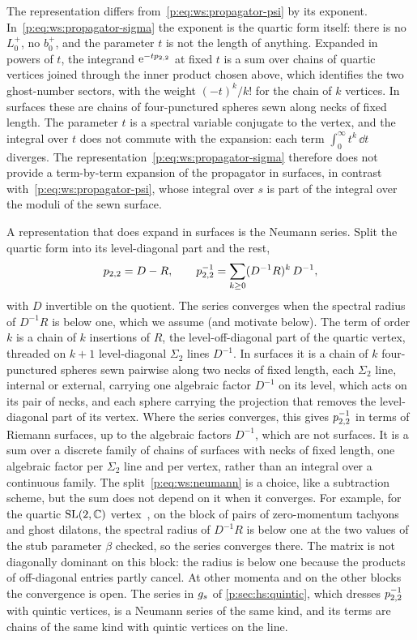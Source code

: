 The representation differs from~\eqref{p:eq:ws:propagator-psi} by its exponent.
In~\eqref{p:eq:ws:propagator-sigma} the exponent is the quartic form itself: there is no $L_0^+$, no $b_0^+$, and the parameter $t$ is not the length of anything.
Expanded in powers of $t$, the integrand $\mathrm{e}^{- t p_{2,2}}$ at fixed $t$ is a sum over chains of quartic vertices joined through the inner product chosen above, which identifies the two ghost-number sectors, with the weight $(- t)^k / k!$ for the chain of $k$ vertices.
In surfaces these are chains of four-punctured spheres sewn along necks of fixed length.
The parameter $t$ is a spectral variable conjugate to the vertex, and the integral over $t$ does not commute with the expansion: each term $\int_0^\infty t^k \, \dd t$ diverges.
The representation~\eqref{p:eq:ws:propagator-sigma} therefore does not provide a term-by-term expansion of the propagator in surfaces, in contrast with~\eqref{p:eq:ws:propagator-psi}, whose integral over $s$ is part of the integral over the moduli of the sewn surface.

A representation that does expand in surfaces is the Neumann series.
Split the quartic form into its level-diagonal part and the rest,
\begin{equation}
  \label{p:eq:ws:neumann}
  p_{2,2}
    = D - R,
  \qquad
  p_{2,2}^{-1}
    = \sum_{k \ge 0} (D^{-1} R)^k \, D^{-1},
\end{equation}
with $D$ invertible on the quotient.
The series converges when the spectral radius of $D^{-1} R$ is below one, which we assume (and motivate below).
The term of order $k$ is a chain of $k$ insertions of $R$, the level-off-diagonal part of the quartic vertex, threaded on $k + 1$ level-diagonal $\Sigma_2$ lines $D^{-1}$.
In surfaces it is a chain of $k$ four-punctured spheres sewn pairwise along two necks of fixed length, each $\Sigma_2$ line, internal or external, carrying one algebraic factor $D^{-1}$ on its level, which acts on its pair of necks, and each sphere carrying the projection that removes the level-diagonal part of its vertex.
Where the series converges, this gives $p_{2,2}^{-1}$ in terms of Riemann surfaces, up to the algebraic factors $D^{-1}$, which are not surfaces.
It is a sum over a discrete family of chains of surfaces with necks of fixed length, one algebraic factor per $\Sigma_2$ line and per vertex, rather than an integral over a continuous family.
The split~\eqref{p:eq:ws:neumann} is a choice, like a subtraction scheme, but the sum does not depend on it when it converges.
For example, for the quartic $\mathrm{SL}(2, \mathbb{C})$ vertex~\cite{Erbin:2023:SL2CQuarticVertex,Erbin:2026:SL2CVerticesClosed}, on the block of pairs of zero-momentum tachyons and ghost dilatons, the spectral radius of $D^{-1} R$ is below one at the two values of the stub parameter $\beta$ checked, so the series converges there.
The matrix is not diagonally dominant on this block: the radius is below one because the products of off-diagonal entries partly cancel.
At other momenta and on the other blocks the convergence is open.
The series in $g_s$ of \cref{p:sec:hs:quintic}, which dresses $p_{2,2}^{-1}$ with quintic vertices, is a Neumann series of the same kind, and its terms are chains of the same kind with quintic vertices on the line.

